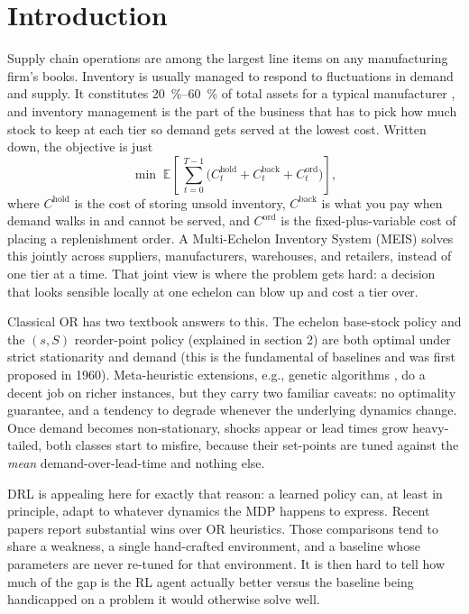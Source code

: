 \documentclass[letterpaper]{article} %
\begin{document}
\section{Introduction}
Supply chain operations are among the largest line items on any manufacturing firm's books.  Inventory is usually managed to respond to fluctuations in demand and supply. It constitutes \SIrange{20}{60}{\percent} of total assets for a typical manufacturer \citep{unyimadu2014inventory}, and inventory management is the part of the business that has to pick how much stock to keep at each tier so demand gets served at the lowest cost. Written down, the objective is just
\begin{equation}
\min\;
\mathbb{E}\!\left[\,\sum_{t=0}^{T-1}\!
    \big(C^{\text{hold}}_t + C^{\text{back}}_t + C^{\text{ord}}_t\big)
\right],
\label{eq:intro-obj}
\end{equation}
where $C^{\text{hold}}$ is the cost of storing unsold inventory, $C^{\text{back}}$ is what you pay when demand walks in and cannot be served, and $C^{\text{ord}}$ is the fixed-plus-variable cost of placing a replenishment order. A Multi-Echelon Inventory System
(MEIS) solves this jointly across suppliers, manufacturers, warehouses, and retailers, instead of one tier at a time. That
joint view is where the problem gets hard: a decision that looks sensible locally at one echelon can blow up and cost a tier over.

Classical OR has two textbook answers to this.
The echelon base-stock policy and the $(s,S)$ reorder-point policy (explained in section 2) are both optimal under strict stationarity and demand (this is the fundamental of baselines and was first proposed in 1960). Meta-heuristic extensions, e.g., genetic algorithms \citep{grahl2016meta}, do a decent job on richer instances, but they carry two familiar caveats: no optimality guarantee, and a tendency to degrade whenever the underlying dynamics change. Once demand becomes non-stationary, shocks appear or lead times grow heavy-tailed, both classes start to misfire, because their set-points are tuned against the \emph{mean} demand-over-lead-time and nothing else.

DRL \citep{sutton2018temporal} is appealing here for exactly that reason: a learned policy can, at least in principle, adapt to whatever dynamics the MDP happens to express. Recent papers \citep{oroojlooyjadid2022deep,gijsbrechts2022can,geevers2024multi,hammler2022multi} report substantial wins over OR heuristics. Those comparisons tend to share a weakness, a single hand-crafted environment, and a baseline whose parameters are never re-tuned for that environment. It is then hard to tell how much of the gap is the RL agent actually better versus the baseline being handicapped on a problem it would otherwise solve well.
\end{document}
